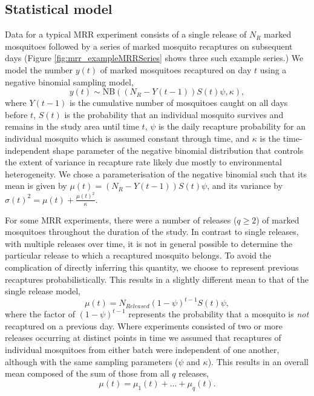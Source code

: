 \documentclass[12pt]{article}
\begin{document}
\subsection{Statistical model}\label{sec:mrr_statistical}
Data for a typical MRR experiment consists of a single release of $N_{R}$ marked mosquitoes followed by a series of marked mosquito recaptures on subsequent days (Figure \ref{fig:mrr_exampleMRRSeries} shows three such example series.) We model the number $y(t)$ of marked mosquitoes recaptured on day $t$ using a negative binomial sampling model,
%
\begin{equation}\label{eq:NB}
y(t) \sim \text{NB}\left((N_{R} - Y(t-1)) S(t) \psi, \kappa\right),
\end{equation}
%
where $Y(t-1)$ is the cumulative number of mosquitoes caught on all days before $t$, $S(t)$ is the probability that an individual mosquito survives and remains in the study area until time $t$, $\psi$ is the daily recapture probability for an individual mosquito which is assumed constant through time, and $\kappa$ is the time-independent shape parameter of the negative binomial distribution that controls the extent of variance in recapture rate likely due mostly to environmental heterogeneity. We chose a parameterisation of the negative binomial such that its mean is given by $\mu(t) = (N_{R} - Y(t-1)) S(t) \psi$, and its variance by $\sigma(t)^2 = \mu(t) + \frac{\mu(t)^2}{\kappa}$. 

For some MRR experiments, there were a number of releases ($q\geq 2$) of marked mosquitoes throughout the duration of the study. In contrast to single releases, with multiple releases over time, it is not in general possible to determine the particular release to which a recaptured mosquito belongs. To avoid the complication of directly inferring this quantity, we choose to represent previous recaptures probabilistically. This results in a slightly different mean to that of the single release model,
%
\begin{equation}
\mu(t) = N_{Released}(1-\psi)^{t-1} S(t) \psi,
\end{equation}
%
where the factor of $(1-\psi)^{t-1}$ represents the probability that a mosquito is \textit{not} recaptured on a previous day. Where experiments consisted of two or more releases occurring at distinct points in time we assumed that recaptures of individual mosquitoes from either batch were independent of one another, although with the same sampling parameters ($\psi$ and $\kappa$). This results in an overall mean composed of the sum of those from all $q$ releases,
%
\begin{equation}
\mu(t) = \mu_1(t) + ... + \mu_q(t).
\end{equation}
%
\end{document}
